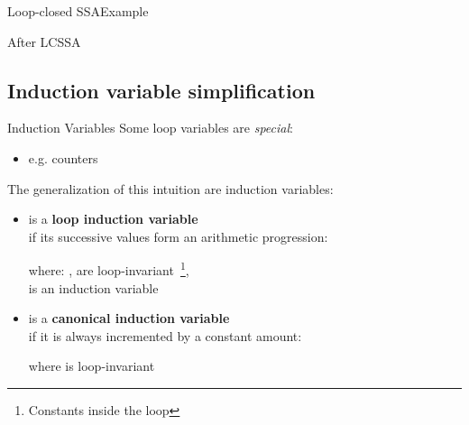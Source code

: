 \begin{frame}{Loop-closed SSA}{Example}
\begin{block}{After LCSSA}
\centering
{}
\end{block}
\vfill
\end{frame}


\subsection{Induction variable simplification}


\begin{frame}{Induction Variables}
Some loop variables are \emph{special}:

\begin{itemize}
\item e.g. counters
\end{itemize}

\vfill
The generalization of this intuition are \alert{induction variables}:

\begin{itemize}
\item {} is a \textbf{loop induction variable}\\
		  if its successive values form
      an arithmetic progression:

      \begin{center}
      \end{center}

      where:
      ,  are loop-invariant~\footnote{Constants inside the loop},\\
      \hphantom{where: } is an induction variable
\item {} is a \textbf{canonical induction variable}\\if it is always
      incremented by a constant amount:

      \begin{center}
      \end{center}

      where  is loop-invariant
\end{itemize}
\end{frame}


